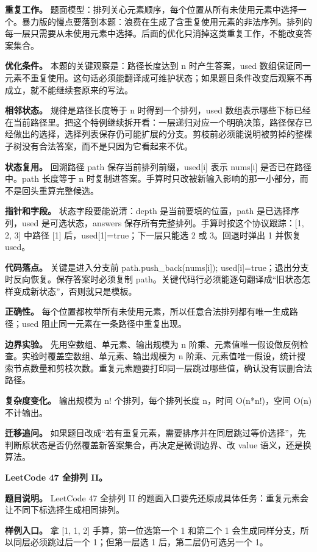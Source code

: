 \textbf{重复工作。} 题面模型：排列关心元素顺序，每个位置从所有未使用元素中选择一个。暴力版的慢点要落到本题：浪费在生成了含重复使用元素的非法序列。排列的每一层只需要从未使用元素中选择。后面的优化只消掉这类重复工作，不能改变答案集合。

\textbf{优化条件。} 本题的关键观察是：路径长度达到 n 时产生答案，used 数组保证同一元素不重复使用。这句话必须能翻译成可维护状态；如果题目条件改变后观察不再成立，就不能继续套原来的写法。

\textbf{相邻状态。} 规律是路径长度等于 n 时得到一个排列，used 数组表示哪些下标已经在当前路径里。把这个特例继续拆开看：一层递归对应一个明确决策，路径保存已经做出的选择，选择列表保存仍可能扩展的分支。剪枝前必须能说明被剪掉的整棵子树没有合法答案，而不是只因为它看起来不优。

\textbf{状态复用。} 回溯路径 path 保存当前排列前缀，used[i] 表示 nums[i] 是否已在路径中。path 长度等于 n 时复制进答案。手算时只改被新输入影响的那一小部分，而不是回头重算完整候选。

\textbf{指针和字段。} 状态字段要能说清：depth 是当前要填的位置，path 是已选择序列，used 是可选状态，answers 保存所有完整排列。手算时按这个协议跟踪：[1, 2, 3] 中路径 [1] 后，used[1]=true；下一层只能选 2 或 3。回退时弹出 1 并恢复 used。

\textbf{代码落点。} 关键是进入分支前 path.push\_back(nums[i]); used[i]=true；退出分支时反向恢复。保存答案时必须复制 path。关键代码行必须能逐句翻译成“旧状态怎样变成新状态”，否则就只是模板。

\textbf{正确性。} 每个位置都枚举所有未使用元素，所以任意合法排列都有唯一生成路径；used 阻止同一元素在一条路径中重复出现。

\textbf{边界实验。} 先用空数组、单元素、输出规模为 n 阶乘、元素值唯一假设做反例检查。实验时覆盖空数组、单元素、输出规模为 n 阶乘、元素值唯一假设，统计搜索节点数量和剪枝次数。重复元素题要打印同一层跳过哪些值，确认没有误删合法路径。

\textbf{复杂度变化。} 输出规模为 n! 个排列，每个排列长度 n，时间 O(n*n!)，空间 O(n) 不计输出。

\textbf{迁移追问。} 如果题目改成“若有重复元素，需要排序并在同层跳过等价选择”，先判断原状态是否仍然覆盖新答案集合，再决定是微调边界、改 value 语义，还是换算法。

\noindent\textbf{LeetCode 47 全排列 II。}

\textbf{题目说明。} LeetCode 47 全排列 II 的题面入口要先还原成具体任务：重复元素会让不同下标选择生成相同排列。

\textbf{样例入口。} 拿 [1, 1, 2] 手算，第一位选第一个 1 和第二个 1 会生成同样分支，所以同层必须跳过后一个 1；但第一层选 1 后，第二层仍可选另一个 1。


